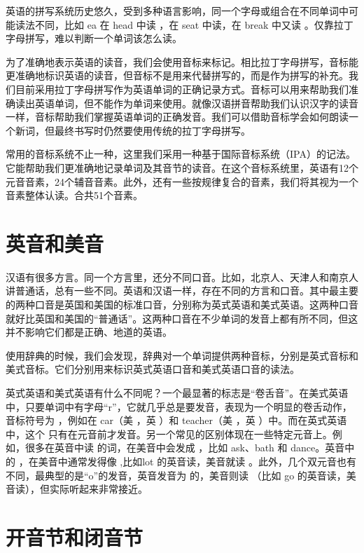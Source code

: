 \documentclass[10.5pt, a4paper]{ctexbook} %
\begin{document}
英语的拼写系统历史悠久，受到多种语言影响，同一个字母或组合在不同单词中可能读法不同，比如 ea 在 head 中读 ，在 seat 中读，在 break 中又读 。仅靠拉丁字母拼写，难以判断一个单词该怎么读。

为了准确地表示英语的读音，我们会使用音标来标记。相比拉丁字母拼写，音标能更准确地标识英语的读音，但音标不是用来代替拼写的，而是作为拼写的补充。我们目前采用拉丁字母拼写作为英语单词的正确记录方式。音标可以用来帮助我们准确读出英语单词，但不能作为单词来使用。就像汉语拼音帮助我们认识汉字的读音一样，音标帮助我们掌握英语单词的正确发音。我们可以借助音标学会如何朗读一个新词，但最终书写时仍然要使用传统的拉丁字母拼写。

常用的音标系统不止一种，这里我们采用一种基于国际音标系统（IPA）的记法。它能帮助我们更准确地记录单词及其音节的读音。在这个音标系统里，英语有12个元音音素，24个辅音音素。此外，还有一些按规律复合的音素，我们将其视为一个音素整体认读。合共51个音素。

\section{英音和美音}

汉语有很多方言。同一个方言里，还分不同口音。比如，北京人、天津人和南京人讲普通话，总有一些不同。英语和汉语一样，存在不同的方言和口音。其中最主要的两种口音是英国和美国的标准口音，分别称为英式英语和美式英语。这两种口音就好比英国和美国的“普通话”。这两种口音在不少单词的发音上都有所不同，但这并不影响它们都是正确、地道的英语。

使用辞典的时候，我们会发现，辞典对一个单词提供两种音标，分别是英式音标和美式音标。它们分别用来标识英式英语口音和美式英语口音的读法。

英式英语和美式英语有什么不同呢？一个最显著的标志是“卷舌音”。在美式英语中，只要单词中有字母“r”，它就几乎总是要发音，表现为一个明显的卷舌动作，音标符号为 ，例如在 car（美 ，英 ）和 teacher（美 ，英 ）中。而在英式英语中，这个  只有在元音前才发音。另一个常见的区别体现在一些特定元音上。例如，很多在英音中读  的词，在美音中会发成 ，比如 ask、bath 和 dance。英音中的 ，在美音中通常发得像 ,比如lot 的英音读，美音就读 。此外，几个双元音也有不同，最典型的是“o”的发音，英音发音为 的，美音则读 （比如 go 的英音读，美音读），但实际听起来非常接近。

\section{开音节和闭音节}
\end{document}
